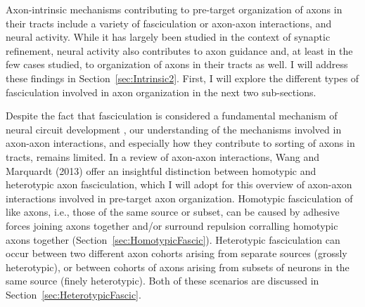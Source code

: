 Axon-intrinsic mechanisms contributing to pre-target organization of axons in their tracts include a variety of fasciculation or axon-axon interactions, and neural activity.
While it has largely been studied in the context of synaptic refinement, neural activity also contributes to axon guidance and, at least in the few cases studied, to organization of axons in their tracts as well.
I will address these findings in Section~\ref{sec:Intrinsic2}.
First, I will explore the different types of fasciculation involved in axon organization in the next two sub-sections.

Despite the fact that fasciculation is considered a fundamental mechanism of neural circuit development \cite[reviewed in][]{raper2010cellular,wang2013axons}, our understanding of the mechanisms involved in axon-axon interactions, and especially how they contribute to sorting of axons in tracts, remains limited.
In a review of axon-axon interactions, Wang and Marquardt (2013) offer an insightful distinction between homotypic and heterotypic axon fasciculation, which I will adopt for this overview of axon-axon interactions involved in pre-target axon organization. 
Homotypic fasciculation of like axons, i.e., those of the same source or subset, can be caused by adhesive forces joining axons together and/or surround repulsion corralling homotypic axons together (Section~\ref{sec:HomotypicFascic}).
Heterotypic fasciculation can occur between two different axon cohorts arising from separate sources (grossly heterotypic), or between cohorts of axons arising from subsets of neurons in the same source (finely heterotypic).
Both of these scenarios are discussed in Section~\ref{sec:HeterotypicFascic}.